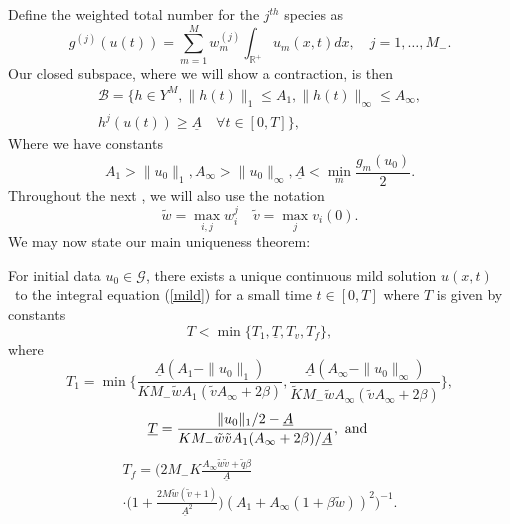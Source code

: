  Define the weighted total number for the $j^{th}$ species as
\begin{equation}
g^{(j)}(u(t))= \sum_{m= 1}^{M} w_m^{(j)}\int_{\mathbb{R}^+} u_m(x,t)dx, \quad j = 1, \dots, M_-.
\end{equation}
Our closed subspace, where we will show a contraction, is then
 \begin{eqnarray}
\mathcal B= \{h\in Y^{M}, \|h(t)\|_1\le A_1, \|h(t)\|_\infty \le A_\infty,    \\ h^j(u(t))\ge\underline{A}  \quad  \forall t \in [0,T]\}, \nonumber
\end{eqnarray}
Where we have constants
\begin{equation}
A_1> \|u_0\|_1, A_\infty>\|u_0\|_\infty, \underline A< \min_m\frac{ g_m(u_0)}{2}.
\end{equation}
Throughout the next , we will also use the notation
\begin{equation}
\tilde w = \max_{i,j} w_i^j \quad \tilde v = \max_j v_i(0).
\end{equation}
We may now state our main uniqueness theorem:
\begin{theorem}\label{unique}
 For initial data $u_0\in \mathcal G$, there exists a unique continuous mild solution $u(x,t)$ \
to the integral equation (\ref{mild}) for a small time $t \in [0,T]$ where $T$ is given by constants
\begin{equation}
T<\min\{T_1, \underline T, T_{v},T_f\},
\end{equation}
where
\begin{equation}
T_1 = \min\{ \frac{\underline A(A_1-\|u_0\|_1)}{K M_{-}\tilde wA_{1}  (\tilde v A_\infty+2\beta)}, \frac{\underline A(A_\infty-\|u_0\|_\infty)}{\tilde K M_{-}\tilde wA_{\infty}  (\tilde v A_\infty+2\beta)}\}, 
\end{equation}
\begin{equation}
\underline{T}= \frac{\|u_0\|_1/{2}-\underline{A}}{KM_-\tilde w \tilde vA_1 (A_\infty+2\beta)/\underline A}, \hbox{ and }  
\end{equation}
\begin{eqnarray}
T_f = \Big(2M_{-}K\frac{A_\infty\tilde w \tilde v+\tilde q\beta }{\underline A}\\\cdot\Big(1+\frac{2M\tilde w(\tilde v+1)}{\underline A^2}\Big)(A_1+A_\infty(1+\beta \tilde w))^2\Big)^{-1}. \nonumber
\end{eqnarray}
\end{theorem}
